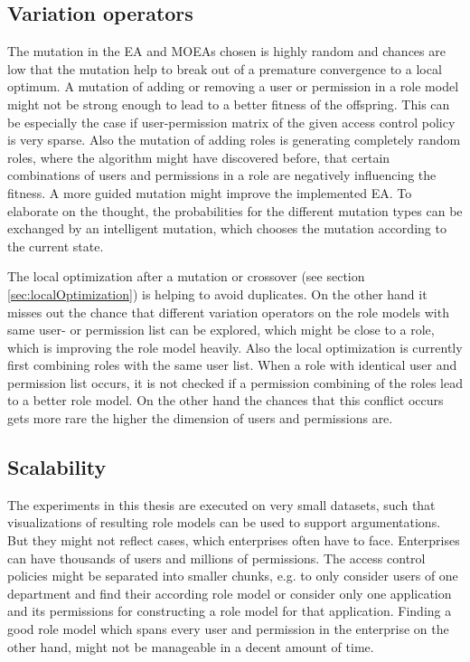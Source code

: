 \subsection*{Variation operators}
	The mutation in the EA and MOEAs chosen is highly random and chances are low that the mutation help to break out of a premature convergence to a local optimum. A mutation of adding or removing a user or permission in a role model might not be strong enough to lead to a better fitness of the offspring. This can be especially the case if user-permission matrix of the given access control policy is very sparse. Also the mutation of adding roles is generating completely random roles, where the algorithm might have discovered before, that certain combinations of users and permissions in a role are negatively influencing the fitness. A more guided mutation might improve the implemented EA. To elaborate on the thought, the probabilities for the different mutation types can be exchanged by an intelligent mutation, which chooses the mutation according to the current state.
	
	The local optimization after a mutation or crossover (see section \ref{sec:localOptimization}) is helping to avoid duplicates. On the other hand it misses out the chance that different variation operators on the role models with same user- or permission list can be explored, which might be close to a role, which is improving the role model heavily. Also the local optimization is currently first combining roles with the same user list. When a role with identical user and permission list occurs, it is not checked if a permission combining of the roles lead to a better role model. On the other hand the chances that this conflict occurs gets more rare the higher the dimension of users and permissions are.
	
\subsection*{Scalability}
	The experiments in this thesis are executed on very small datasets, such that visualizations of resulting role models can be used to support argumentations. But they might not reflect cases, which enterprises often have to face. Enterprises can have thousands of users and millions of permissions. The access control policies might  be separated into smaller chunks, e.g. to only consider users of one department and find their according role model or consider only one application and its permissions for constructing a role model for that application. Finding a good role model which spans every user and permission in the enterprise on the other hand, might not be manageable in a decent amount of time.
	

